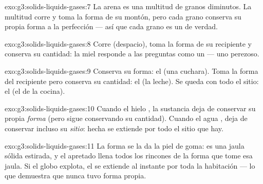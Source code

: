 \begin{solution}{exo:g3:solids-liquids-gases:7}
La arena es una multitud de granos  diminutos. La multitud
corre y toma la forma de su montón, pero cada grano conserva su propia
forma a la perfección --- así que cada grano es un  de verdad.
\end{solution}

\begin{solution}{exo:g3:solids-liquids-gases:8}
Corre (despacio), toma la forma de su recipiente y conserva su
cantidad: la miel responde a las preguntas como un  --- uno
perezoso.
\end{solution}

\begin{solution}{exo:g3:solids-liquids-gases:9}
Conserva su forma: el  (una cuchara). Toma la forma del
recipiente pero conserva su cantidad: el  (la leche). Se queda
con todo el sitio: el  (el  de la cocina).
\end{solution}

\begin{solution}{exo:g3:solids-liquids-gases:10}
Cuando el hielo , la sustancia deja de conservar su propia
\emph{forma} (pero sigue conservando su cantidad). Cuando el agua
, deja de conservar incluso su \emph{sitio}: hecha  se
extiende por todo el sitio que hay.
\end{solution}

\begin{solution}{exo:g3:solids-liquids-gases:11}
La forma se la da la piel de goma: es una jaula sólida estirada, y el
 apretado llena todos los rincones de la forma que tome esa
jaula. Si el globo explota, el  se extiende al instante por toda
la habitación --- lo que demuestra que nunca tuvo forma propia.
\end{solution}
